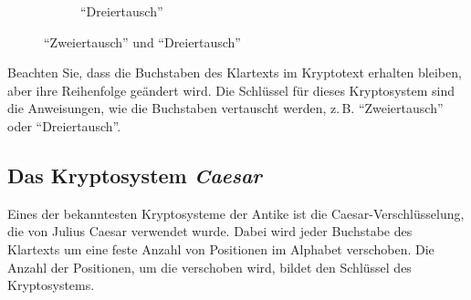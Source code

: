 \begin{myexercise}
\begin{myanswer}
\begin{figure}[H]
\begin{subfigure}[b]{0.48\textwidth}
				\caption{\enquote{Dreiertausch}}
			\end{subfigure}
			\caption{\enquote{Zweiertausch} und \enquote{Dreiertausch}}
			\label{fig:transposition-cipher}
		\end{figure}
		Beachten Sie, dass die Buchstaben des Klartexts im Kryptotext erhalten bleiben, aber ihre Reihenfolge geändert wird.
		Die Schlüssel für dieses Kryptosystem sind die Anweisungen, wie die Buchstaben vertauscht werden, z.\,B. \enquote{Zweiertausch} oder \enquote{Dreiertausch}.
	\end{myanswer}
\end{myexercise}


\subsection{Das Kryptosystem \emph{Caesar}}
\label{subsec:caesar}
Eines der bekanntesten Kryptosysteme der Antike ist die Caesar-Verschlüsselung, die von Julius Caesar verwendet wurde.
Dabei wird jeder Buchstabe des Klartexts um eine feste Anzahl von Positionen im Alphabet verschoben.
Die Anzahl der Positionen, um die verschoben wird, bildet den Schlüssel des Kryptosystems.

